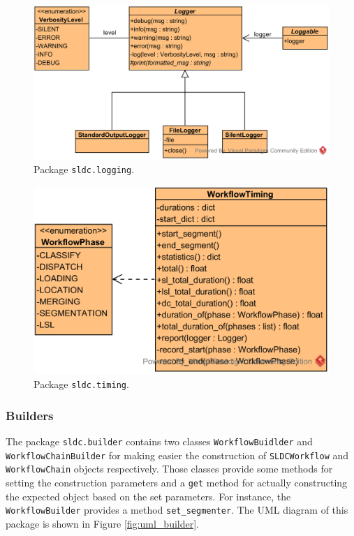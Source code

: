 \begin{figure}
	\center
	\includegraphics[scale=0.75]{image/uml_logging.png}
	\caption{Package \texttt{sldc.logging}.}
	\label{fig:uml_logging}
\end{figure}

\begin{figure}
	\center
	\includegraphics[scale=0.75]{image/uml_timing.png}
	\caption{Package \texttt{sldc.timing}.}
	\label{fig:uml_timing}
\end{figure}

\subsubsection{Builders}
The package \texttt{sldc.builder} contains two classes \texttt{WorkflowBuidlder} and \texttt{WorkflowChainBuilder} for making easier the construction of \texttt{SLDCWorkflow} and \texttt{WorkflowChain} objects respectively. Those classes provide some methods for setting the construction parameters and a \texttt{get} method for actually constructing the expected object based on the set parameters. For instance, the \texttt{WorkflowBuilder} provides a method \texttt{set\_segmenter}. The UML diagram of this package is shown in Figure \ref{fig:uml_builder}.

